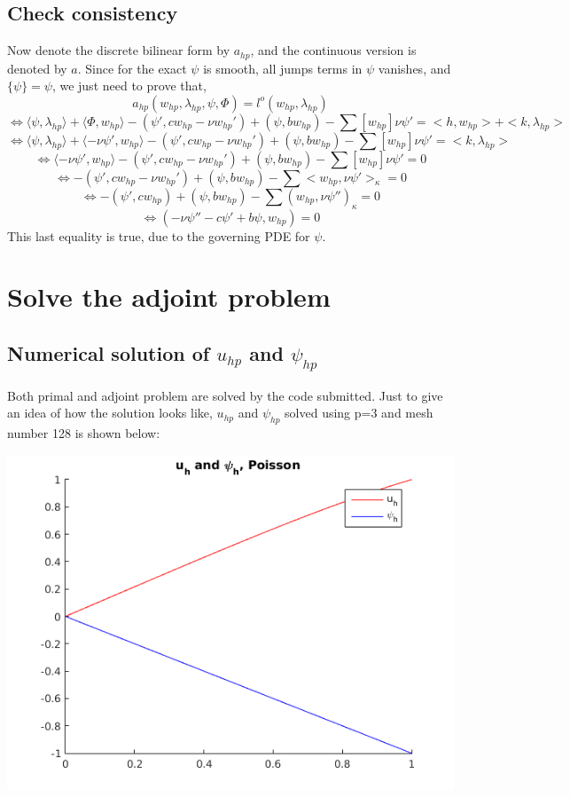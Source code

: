 \documentclass{article}
\begin{document}
\subsection{Check consistency}
Now denote the discrete bilinear form by $a_{hp}$, and the continuous version is denoted by $a$. Since for the exact $\psi$ is smooth, all jumps terms in $\psi$ vanishes, and $\{ \psi\} = \psi	$, we just need to prove that,
    \[
    a_{hp}(w_{hp}, \lambda_{hp},\psi,\Phi)  = l^o (w_{hp},\lambda_{hp})
    \]
    \[
    \Leftrightarrow \langle \psi, \lambda_{hp}\rangle  + \langle \Phi, w_{hp}\rangle  - (\psi', cw_{hp}-\nu w_{hp}') + (\psi, bw_{hp}) - \sum[w_{hp}]\nu \psi' = <h,w_{hp}> + <k,\lambda_{hp}> 
    \]
    \[
    \Leftrightarrow  \langle \psi, \lambda_{hp}\rangle  + \langle -\nu\psi', w_{hp}\rangle  - (\psi', cw_{hp}-\nu w_{hp}') + (\psi, bw_{hp}) - \sum[w_{hp}]\nu \psi' = <k,\lambda_{hp}>
    \]
    \[
    \Leftrightarrow  \langle -\nu\psi', w_{hp}\rangle  - (\psi', cw_{hp}-\nu w_{hp}') + (\psi, bw_{hp}) - \sum[w_{hp}]\nu \psi' = 0
    \]
    \[
    \Leftrightarrow  - (\psi', cw_{hp}-\nu w_{hp}') + (\psi, bw_{hp}) - \sum <w_{hp},\nu \psi'>_\kappa = 0
    \]
    \[
    \Leftrightarrow  - (\psi', cw_{hp}) + (\psi, bw_{hp}) - \sum (w_{hp}, \nu \psi'')_\kappa = 0
    \]
    \[
    \Leftrightarrow  (-\nu \psi'' -c\psi' +b\psi, w_{hp}) = 0
    \]
This last equality is true, due to the governing PDE for $\psi$.

\section{Solve the adjoint problem}
\label{sec:adjoint solve}
\subsection{ Numerical solution of $u_{hp}$ and $\psi_{hp}$}
Both primal and adjoint problem are solved by the code submitted. 
Just to give an idea of how the solution looks like, 
$u_{hp}$ and $\psi_{hp}$ solved using p=3 and mesh number 128 is shown below:
\begin{center}
	\includegraphics[scale = 0.8] {upsiP.png}
\end{center}
\end{document}
